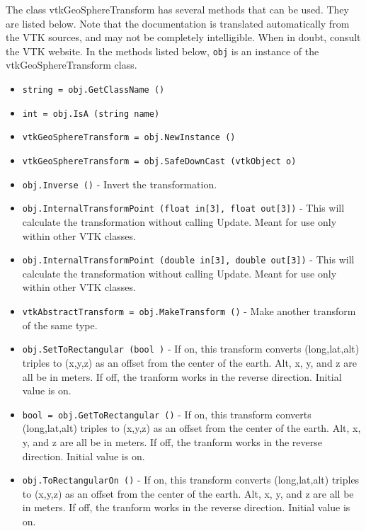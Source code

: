 The class vtkGeoSphereTransform has several methods that can be used.
  They are listed below.
Note that the documentation is translated automatically from the VTK sources,
and may not be completely intelligible.  When in doubt, consult the VTK website.
In the methods listed below, \verb|obj| is an instance of the vtkGeoSphereTransform class.
\begin{itemize}
\item  \verb|string = obj.GetClassName ()|

\item  \verb|int = obj.IsA (string name)|

\item  \verb|vtkGeoSphereTransform = obj.NewInstance ()|

\item  \verb|vtkGeoSphereTransform = obj.SafeDownCast (vtkObject o)|

\item  \verb|obj.Inverse ()| -  Invert the transformation.

\item  \verb|obj.InternalTransformPoint (float in[3], float out[3])| -  This will calculate the transformation without calling Update.
 Meant for use only within other VTK classes.

\item  \verb|obj.InternalTransformPoint (double in[3], double out[3])| -  This will calculate the transformation without calling Update.
 Meant for use only within other VTK classes.

\item  \verb|vtkAbstractTransform = obj.MakeTransform ()| -  Make another transform of the same type.

\item  \verb|obj.SetToRectangular (bool )| -  If on, this transform converts (long,lat,alt) triples to (x,y,z) as an offset
 from the center of the earth. Alt, x, y, and z are all be in meters.
 If off, the tranform works in the reverse direction.
 Initial value is on.

\item  \verb|bool = obj.GetToRectangular ()| -  If on, this transform converts (long,lat,alt) triples to (x,y,z) as an offset
 from the center of the earth. Alt, x, y, and z are all be in meters.
 If off, the tranform works in the reverse direction.
 Initial value is on.

\item  \verb|obj.ToRectangularOn ()| -  If on, this transform converts (long,lat,alt) triples to (x,y,z) as an offset
 from the center of the earth. Alt, x, y, and z are all be in meters.
 If off, the tranform works in the reverse direction.
 Initial value is on.


\end{itemize}
